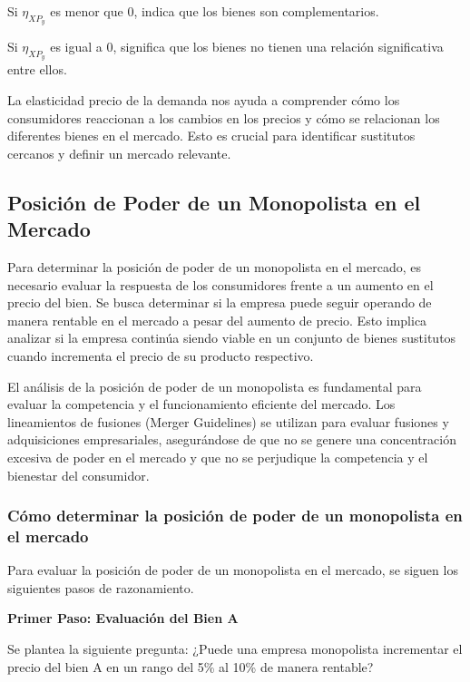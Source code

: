 \documentclass[
  letterpaper,
  DIV=11,
  numbers=noendperiod]{scrartcl}
\begin{document}
Si \(\eta_{XP_y}\) es menor que 0, indica que los bienes son
complementarios.

Si \(\eta_{XP_y}\) es igual a 0, significa que los bienes no tienen una
relación significativa entre ellos.

La elasticidad precio de la demanda nos ayuda a comprender cómo los
consumidores reaccionan a los cambios en los precios y cómo se
relacionan los diferentes bienes en el mercado. Esto es crucial para
identificar sustitutos cercanos y definir un mercado relevante.

\hypertarget{posiciuxf3n-de-poder-de-un-monopolista-en-el-mercado}{%
\subsection{Posición de Poder de un Monopolista en el
Mercado}\label{posiciuxf3n-de-poder-de-un-monopolista-en-el-mercado}}

Para determinar la posición de poder de un monopolista en el mercado, es
necesario evaluar la respuesta de los consumidores frente a un aumento
en el precio del bien. Se busca determinar si la empresa puede seguir
operando de manera rentable en el mercado a pesar del aumento de precio.
Esto implica analizar si la empresa continúa siendo viable en un
conjunto de bienes sustitutos cuando incrementa el precio de su producto
respectivo.

El análisis de la posición de poder de un monopolista es fundamental
para evaluar la competencia y el funcionamiento eficiente del mercado.
Los lineamientos de fusiones (Merger Guidelines) se utilizan para
evaluar fusiones y adquisiciones empresariales, asegurándose de que no
se genere una concentración excesiva de poder en el mercado y que no se
perjudique la competencia y el bienestar del consumidor.

\hypertarget{cuxf3mo-determinar-la-posiciuxf3n-de-poder-de-un-monopolista-en-el-mercado}{%
\subsubsection{Cómo determinar la posición de poder de un monopolista en
el
mercado}\label{cuxf3mo-determinar-la-posiciuxf3n-de-poder-de-un-monopolista-en-el-mercado}}

Para evaluar la posición de poder de un monopolista en el mercado, se
siguen los siguientes pasos de razonamiento.

\textbf{Primer Paso: Evaluación del Bien A}

Se plantea la siguiente pregunta: ¿Puede una empresa monopolista
incrementar el precio del bien A en un rango del 5\% al 10\% de manera
rentable?
\end{document}
